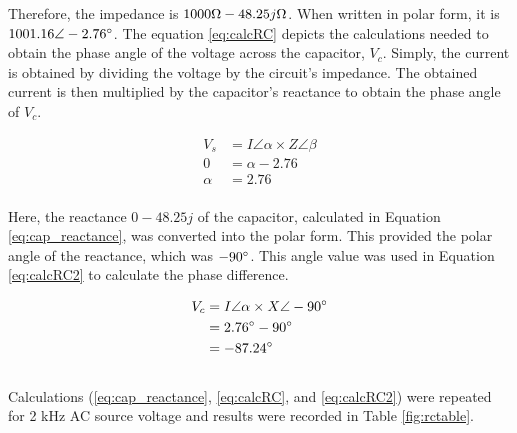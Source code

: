 \documentclass[journal]{IEEEtran}
\begin{document}
\noindent Therefore, the impedance is $1000\ohm - 48.25j\ohm$. When written in polar form, it is $1001.16 \angle-2.76\degree$. The equation \ref{eq:calcRC} depicts the calculations needed to obtain the phase angle of the voltage across the capacitor, $V_{c}$. Simply, the current is obtained by dividing the voltage by the circuit's impedance. The obtained current is then multiplied by the capacitor's reactance to obtain the phase angle of $V_c$.

\begin{equation}
    \begin{split}
        V_s & = I \angle \alpha \times Z \angle \beta \\
        0 & = \alpha - 2.76 \\
        \alpha & = 2.76
    \end{split}
    \label{eq:calcRC}
\end{equation} \\

\noindent Here, the reactance $0 - 48.25j$ of the capacitor, calculated in Equation \ref{eq:cap_reactance}, was converted into the polar form. This provided the polar angle of the reactance, which was $-90\degree$. This angle value was used in Equation \ref{eq:calcRC2} to calculate the phase difference.

\begin{equation}
    \begin{split}
        V_c & = I \angle \alpha \times X \angle -90\degree \\
            & = 2.76\degree - 90\degree \\
            & = -87.24\degree
    \end{split}
    \label{eq:calcRC2}
\end{equation} \\

\noindent Calculations (\ref{eq:cap_reactance}, \ref{eq:calcRC}, and \ref{eq:calcRC2}) were repeated for 2 kHz AC source voltage and results were recorded in Table \ref{fig:rctable}.
\end{document}
